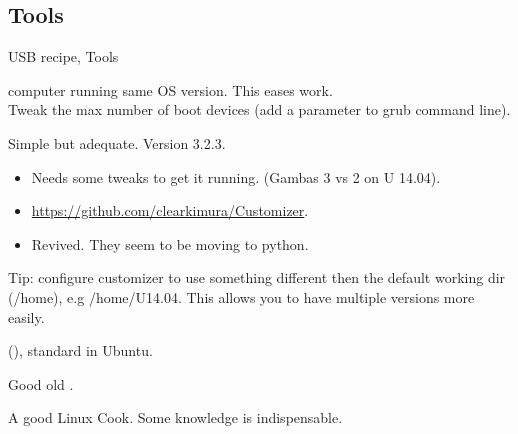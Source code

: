 \subsection{Tools}
\begin{frame}{USB recipe, Tools}
  \begin{description}[short]
  \item[Host] computer running same OS version. This eases work.\\
    Tweak the max number of boot devices (add a parameter to grub command line).
  \item[Customizer] Simple but adequate. Version 3.2.3.
    \begin{itemize}
    \item Needs some tweaks to get it running. (Gambas 3 vs 2 on U 14.04).
    \item \url{https://github.com/clearkimura/Customizer}.
    \item Revived. They seem to be moving to python.
    \end{itemize}
  \item[Configure] Tip: configure customizer to use something
    different then the default working dir (/home), e.g
    /home/U14.04. This allows you to have multiple versions more easily.
  \item[Startup Disk Creator] (),
    standard in Ubuntu.
  \item[DD] Good old .
  \item[Cook] A good Linux Cook\InlineSmiley. Some knowledge is indispensable.
  \end{description}
\end{frame}

